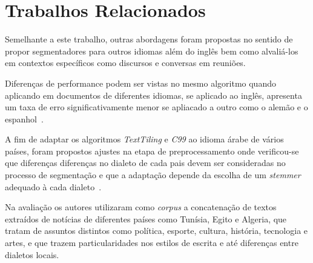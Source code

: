 \section{Trabalhos Relacionados}
	\label{sec:trabalhos}






Semelhante a este trabalho, outras abordagens foram propostas no sentido de propor segmentadores para outros idiomas além do inglês bem como alvaliá-los em contextos específicos como discursos e conversas em reuniões.

Diferenças de performance podem ser vistas no mesmo algoritmo quando aplicando em documentos de diferentes idiomas, se aplicado ao inglês, apresenta um taxa de erro significativamente menor se apliacado a outro como o alemão e o espanhol~\cite{Kern2009}.


A fim de adaptar os algoritmos \textit{TextTiling} e \textit{C99} ao idioma árabe de vários países, foram propostos ajustes na etapa de preprocessamento onde verificou-se que diferenças diferenças no dialeto de cada pais devem ser consideradas no processo de segmentação e que a adaptação depende da escolha de um \textit{stemmer} adequado à cada dialeto~\cite{CHAIBI2014}.


Na avaliação os autores utilizaram como \textit{corpus} a concatenação de textos extraídos de notícias de diferentes países como Tunísia, Egito e Algeria, que tratam de assuntos distintos como política, esporte, cultura, história, tecnologia e artes, e que trazem particularidades nos estilos de escrita e até diferenças entre dialetos locais. %





